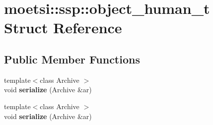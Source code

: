 \hypertarget{structmoetsi_1_1ssp_1_1object__human__t}{}\section{moetsi\+:\+:ssp\+:\+:object\+\_\+human\+\_\+t Struct Reference}
\label{structmoetsi_1_1ssp_1_1object__human__t}
\subsection*{Public Member Functions}
\begin{DoxyCompactItemize}
\item 
\mbox{\label{structmoetsi_1_1ssp_1_1object__human__t_a74cbe99bed62452a496fdd1fd5cc2bdd}} 
{\footnotesize template$<$class Archive $>$ }\\void {\bfseries serialize} (Archive \&ar)
\item 
\mbox{\label{structmoetsi_1_1ssp_1_1object__human__t_a74cbe99bed62452a496fdd1fd5cc2bdd}} 
{\footnotesize template$<$class Archive $>$ }\\void {\bfseries serialize} (Archive \&ar)
\end{DoxyCompactItemize}
